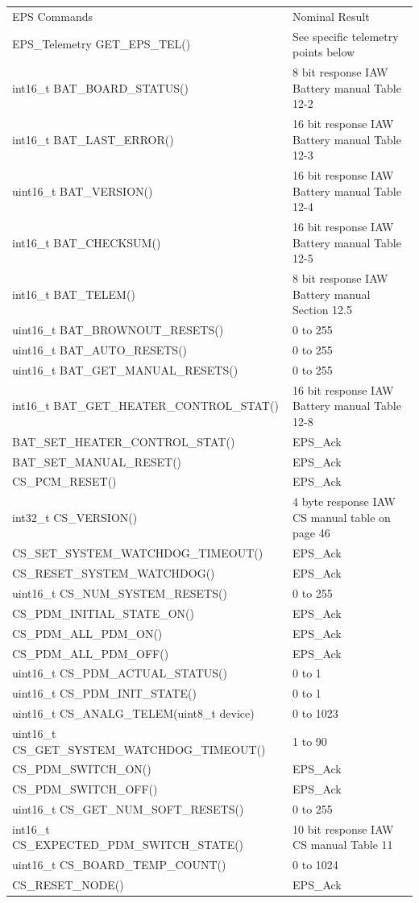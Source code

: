 \documentclass{article}
\begin{document}
\newpage
\begin{tabular}{|l|l|}
	\hline
	EPS Commands      &  Nominal Result                \\ \hhline{|=|=|}
	EPS_Telemetry GET_EPS_TEL() & See specific telemetry points below \\ \hline
	int16_t BAT_BOARD_STATUS() & 8 bit response IAW Battery manual Table 12-2 \\ \hline
	int16_t BAT_LAST_ERROR() & 16 bit response IAW Battery manual Table 12-3 \\ \hline
	uint16_t BAT_VERSION() & 16 bit response IAW Battery manual Table 12-4 \\ \hline
	int16_t BAT_CHECKSUM() & 16 bit response IAW Battery manual Table 12-5 \\ \hline
	int16_t BAT_TELEM() & 8 bit response IAW Battery manual Section 12.5 \\ \hline
	uint16_t BAT_BROWNOUT_RESETS() & 0 to 255 \\ \hline
	uint16_t BAT_AUTO_RESETS() & 0 to 255 \\ \hline
	uint16_t BAT_GET_MANUAL_RESETS() & 0 to 255 \\ \hline
	int16_t BAT_GET_HEATER_CONTROL_STAT() & 16 bit response IAW Battery manual Table 12-8 \\ \hline
	BAT_SET_HEATER_CONTROL_STAT() & EPS_Ack \\ \hline
	BAT_SET_MANUAL_RESET() & EPS_Ack \\ \hline
	CS_PCM_RESET()  & EPS_Ack \\ \hline
	int32_t CS_VERSION() & 4 byte response IAW CS manual table on page 46 \\ \hline
	CS_SET_SYSTEM_WATCHDOG_TIMEOUT() & EPS_Ack \\ \hline
	CS_RESET_SYSTEM_WATCHDOG() & EPS_Ack \\ \hline
	uint16_t CS_NUM_SYSTEM_RESETS() & 0 to 255 \\ \hline
	CS_PDM_INITIAL_STATE_ON() & EPS_Ack \\ \hline
	CS_PDM_ALL_PDM_ON() & EPS_Ack \\ \hline
	CS_PDM_ALL_PDM_OFF()  & EPS_Ack \\ \hline
	uint16_t CS_PDM_ACTUAL_STATUS() & 0 to 1 \\ \hline
	uint16_t CS_PDM_INIT_STATE() & 0 to 1 \\ \hline
	uint16_t CS_ANALG_TELEM(uint8_t device) & 0 to 1023 \\ \hline
	uint16_t CS_GET_SYSTEM_WATCHDOG_TIMEOUT() & 1 to 90 \\ \hline
	CS_PDM_SWITCH_ON() & EPS_Ack \\ \hline
	CS_PDM_SWITCH_OFF() & EPS_Ack \\ \hline
	uint16_t CS_GET_NUM_SOFT_RESETS() & 0 to 255 \\ \hline
	int16_t CS_EXPECTED_PDM_SWITCH_STATE() & 10 bit response IAW CS manual Table 11 \\ \hline
	uint16_t CS_BOARD_TEMP_COUNT() & 0 to 1024 \\ \hline
	CS_RESET_NODE() & EPS_Ack \\ \hline
\end{tabular}
\end{document}
